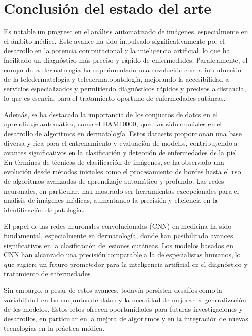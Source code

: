 \section{Conclusión del estado del arte}

Es notable un progreso en el análisis automatizado de imágenes, especialmente en el ámbito médico. Este avance ha sido impulsado significativamente por el desarrollo en la potencia computacional y la inteligencia artificial, lo que ha facilitado un diagnóstico más preciso y rápido de enfermedades. Paralelamente, el campo de la dermatología ha experimentado una revolución con la introducción de la teledermatología y teledermatopatología, mejorando la accesibilidad a servicios especializados y permitiendo diagnósticos rápidos y precisos a distancia, lo que es esencial para el tratamiento oportuno de enfermedades cutáneas.

Además, se ha destacado la importancia de los conjuntos de datos en el aprendizaje automático, como el HAM10000, que han sido cruciales en el desarrollo de algoritmos en dermatología. Estos datasets proporcionan una base diversa y rica para el entrenamiento y evaluación de modelos, contribuyendo a avances significativos en la clasificación y detección de enfermedades de la piel. En términos de técnicas de clasificación de imágenes, se ha observado una evolución desde métodos iniciales como el procesamiento de bordes hasta el uso de algoritmos avanzados de aprendizaje automático y profundo. Las redes neuronales, en particular, han mostrado ser herramientas excepcionales para el análisis de imágenes médicas, aumentando la precisión y eficiencia en la identificación de patologías.

El papel de las redes neuronales convolucionales (CNN) en medicina ha sido fundamental, especialmente en dermatología, donde han posibilitado avances significativos en la clasificación de lesiones cutáneas. Los modelos basados en CNN han alcanzado una precisión comparable a la de especialistas humanos, lo que sugiere un futuro prometedor para la inteligencia artificial en el diagnóstico y tratamiento de enfermedades.

Sin embargo, a pesar de estos avances, todavía persisten desafíos como la variabilidad en los conjuntos de datos y la necesidad de mejorar la generalización de los modelos. Estos retos ofrecen oportunidades para futuras investigaciones y desarrollos, en particular en la mejora de algoritmos y en la integración de nuevas tecnologías en la práctica médica.